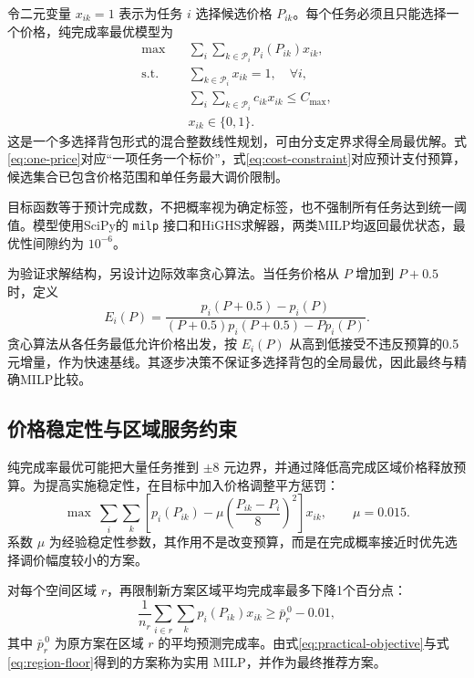 ﻿\documentclass[UTF8,zihao=-4,a4paper,fontset=fandol]{ctexart}
\begin{document}
令二元变量 $x_{ik}=1$ 表示为任务 $i$ 选择候选价格 $P_{ik}$。每个任务必须且只能选择一个价格，纯完成率最优模型为
\begin{align}
\max\quad &\sum_i\sum_{k\in\mathcal P_i}p_i(P_{ik})x_{ik},
\label{eq:milp-objective}\\
\text{s.t.}\quad
&\sum_{k\in\mathcal P_i}x_{ik}=1,\quad \forall i, \label{eq:one-price}\\
&\sum_i\sum_{k\in\mathcal P_i}c_{ik}x_{ik}\le C_{\max}, \label{eq:cost-constraint}\\
&x_{ik}\in\{0,1\}. \label{eq:binary}
\end{align}
这是一个多选择背包形式的混合整数线性规划，可由分支定界求得全局最优解\cite{dantzig1957}。式\eqref{eq:one-price}对应“一项任务一个标价”，式\eqref{eq:cost-constraint}对应预计支付预算，候选集合已包含价格范围和单任务最大调价限制。

目标函数等于预计完成数，不把概率视为确定标签，也不强制所有任务达到统一阈值。模型使用SciPy的 \texttt{milp} 接口和HiGHS求解器，两类MILP均返回最优状态，最优性间隙约为 $10^{-6}$。

为验证求解结构，另设计边际效率贪心算法。当任务价格从 $P$ 增加到 $P+0.5$ 时，定义
\begin{equation}
E_i(P)=
\frac{p_i(P+0.5)-p_i(P)}
{(P+0.5)p_i(P+0.5)-Pp_i(P)}.
\label{eq:marginal-efficiency}
\end{equation}
贪心算法从各任务最低允许价格出发，按 $E_i(P)$ 从高到低接受不违反预算的0.5元增量，作为快速基线。其逐步决策不保证多选择背包的全局最优，因此最终与精确MILP比较。

\subsection{价格稳定性与区域服务约束}

纯完成率最优可能把大量任务推到 $\pm8$ 元边界，并通过降低高完成区域价格释放预算。为提高实施稳定性，在目标中加入价格调整平方惩罚：
\begin{equation}
\max\ \sum_i\sum_k
\left[p_i(P_{ik})-\mu\left(\frac{P_{ik}-P_i}{8}\right)^2\right]x_{ik},
\qquad \mu=0.015.
\label{eq:practical-objective}
\end{equation}
系数 $\mu$ 为经验稳定性参数，其作用不是改变预算，而是在完成概率接近时优先选择调价幅度较小的方案。

对每个空间区域 $r$，再限制新方案区域平均完成率最多下降1个百分点：
\begin{equation}
\frac{1}{n_r}\sum_{i\in r}\sum_kp_i(P_{ik})x_{ik}
\ge \bar p_r^{\,0}-0.01,
\label{eq:region-floor}
\end{equation}
其中 $\bar p_r^{\,0}$ 为原方案在区域 $r$ 的平均预测完成率。由式\eqref{eq:practical-objective}与式\eqref{eq:region-floor}得到的方案称为实用 MILP，并作为最终推荐方案。
\end{document}
